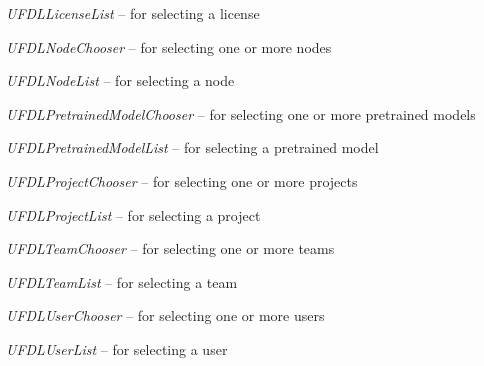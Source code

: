 \documentclass[a4paper]{book}
\begin{document}
\begin{tight_itemize}
  \item \textit{UFDLLicenseList} -- for selecting a license
  \item \textit{UFDLNodeChooser} -- for selecting one or more nodes
  \item \textit{UFDLNodeList} -- for selecting a node
  \item \textit{UFDLPretrainedModelChooser} -- for selecting one or more pretrained models
  \item \textit{UFDLPretrainedModelList} -- for selecting a pretrained model
  \item \textit{UFDLProjectChooser} -- for selecting one or more projects
  \item \textit{UFDLProjectList} -- for selecting a project
  \item \textit{UFDLTeamChooser} -- for selecting one or more teams
  \item \textit{UFDLTeamList} -- for selecting a team
  \item \textit{UFDLUserChooser} -- for selecting one or more users
  \item \textit{UFDLUserList} -- for selecting a user
\end{tight_itemize}
\end{document}
